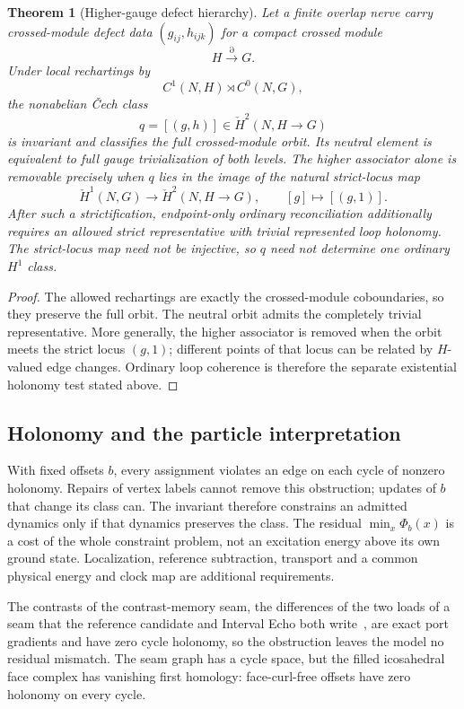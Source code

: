 \documentclass[11pt]{article}
\newtheorem{theorem}{Theorem}[section]
\theoremstyle{remark}
\theoremstyle{plain}
\begin{document}
\begin{theorem}[Higher-gauge defect hierarchy]\label{thm:higherdefects}
Let a finite overlap nerve carry crossed-module defect data \((g_{ij},h_{ijk})\) for a compact crossed module
\[
H\xrightarrow{\partial} G.
\]
Under local rechartings by
\[
C^1(N,H)\rtimes C^0(N,G),
\]
the nonabelian \v{C}ech class
\[
q=[(g,h)]\in \check H^2(N,H\to G)
\]
is invariant and classifies the full crossed-module orbit. Its neutral element is equivalent to
full gauge trivialization of both levels. The higher associator alone is removable precisely when
\(q\) lies in the image of the natural strict-locus map
\[
\check H^1(N,G)\longrightarrow\check H^2(N,H\to G),\qquad[g]\longmapsto[(g,1)].
\]
After such a strictification, endpoint-only ordinary reconciliation additionally requires an
allowed strict representative with trivial represented loop holonomy. The strict-locus map need
not be injective, so \(q\) need not determine one ordinary \(H^1\) class.
\end{theorem}

\begin{proof}
The allowed rechartings are exactly the crossed-module coboundaries, so they preserve the full
orbit. The neutral orbit admits the completely trivial representative. More generally, the higher
associator is removed when the orbit meets the strict locus \((g,1)\); different points of that
locus can be related by \(H\)-valued edge changes. Ordinary loop coherence is therefore the
separate existential holonomy test stated above.
\end{proof}

\subsection{Holonomy and the particle interpretation}
\label{sec:frustration-matter}

With fixed offsets $b$, every assignment violates an edge on each cycle of
nonzero holonomy. Repairs of vertex labels cannot remove this obstruction;
updates of $b$ that change its class can. The invariant therefore constrains
an admitted dynamics only if that dynamics preserves the class.
The residual $\min_x\Phi_b(x)$ is a cost of the whole constraint problem,
not an excitation energy above its own ground state. Localization,
reference subtraction, transport and a common physical energy and clock
map are additional requirements.

The contrasts of the contrast-memory seam, the differences of the two loads
of a seam that the reference candidate and Interval Echo both
write~\cite{ophmodel}, are exact port gradients and have zero cycle
holonomy, so the obstruction leaves the model no residual mismatch. The seam
graph has a cycle space, but the filled icosahedral face
complex has vanishing first homology: face-curl-free offsets have zero
holonomy on every cycle.
\end{document}
